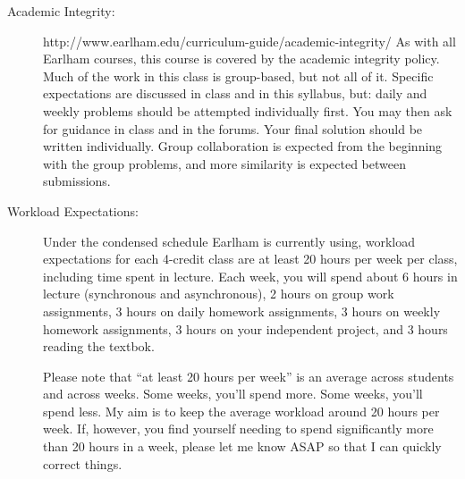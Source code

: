 \documentclass[12pt]{article}
\begin{document}
\begin{description}
    \item[Academic Integrity:] {\small http://www.earlham.edu/curriculum-guide/academic-integrity/} As with all Earlham courses, this course is covered by the academic integrity policy. Much of the work in this class is group-based, but not all of it. Specific expectations are discussed in class and in this syllabus, but: daily and weekly problems should be attempted individually first. You may then ask for guidance in class and in the forums. Your final solution should be written individually. Group collaboration is expected from the beginning with the group problems, and more similarity is expected between submissions.

      \item[Workload Expectations:] Under the condensed schedule Earlham is currently using, workload expectations for each 4-credit class are at least 20 hours per week per class, including time spent in lecture. Each week, you will spend about 6 hours in lecture (synchronous and asynchronous), 2 hours on group work assignments, 3 hours on daily homework assignments, 3 hours on weekly homework assignments, 3 hours on your independent project, and 3 hours reading the textbok.

Please note that ``at least 20 hours per week'' is an average across students and across weeks. Some weeks, you'll spend more. Some weeks, you'll spend less. My aim is to keep the average workload around 20 hours per week. If, however, you find yourself needing to spend significantly more than 20 hours in a week, please let me know ASAP so that I can quickly correct things.
\end{description}


\end{document}
